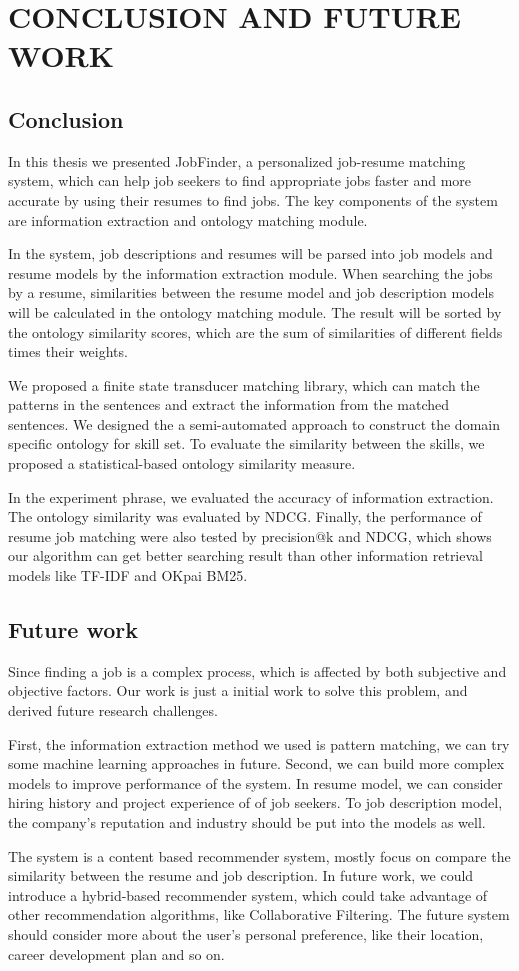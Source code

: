 \chapter{CONCLUSION AND FUTURE WORK}

\section{Conclusion}
In this thesis we presented JobFinder, a personalized job-resume matching system, which can help job seekers to find appropriate jobs faster and more accurate by using their resumes to find jobs. The key components of the system are information extraction and ontology matching module.

In the system, job descriptions and resumes will be parsed into job models and resume models by the information extraction module. When searching the jobs by a resume, similarities between the resume model and job description models will be calculated in the ontology matching module. The result will be sorted by the ontology similarity scores, which are the sum of similarities of different fields times their weights.

We proposed a finite state transducer matching library, which can match the patterns in the sentences and extract the information from the matched sentences. We designed the a semi-automated approach to construct the domain specific ontology for skill set. To evaluate the similarity between the skills, we proposed a statistical-based ontology similarity measure.

In the experiment phrase, we evaluated the accuracy of information extraction. The ontology similarity was evaluated by NDCG. Finally, the performance of resume job matching were also tested by precision@k and NDCG,  which shows our algorithm can get better searching result than other information retrieval models like TF-IDF and OKpai BM25.


\section{Future work}

Since finding a job is a complex process, which is affected by both subjective and objective factors.  Our work is just a initial work to solve this problem, and derived future research challenges.

First, the information extraction method we used is pattern matching, we can try some machine learning approaches in future. Second, we can build more complex models to improve performance of the system. In resume model, we can consider hiring history and project experience of of job seekers. To job description model, the company's reputation and industry should be put into the models as well.

The system is a content based recommender system, mostly focus on compare the similarity between the resume and job description. In future work, we could introduce a hybrid-based recommender system, which could take advantage of other recommendation algorithms, like Collaborative Filtering. The future system should consider more about the user's personal preference, like their location, career development plan and so on.
